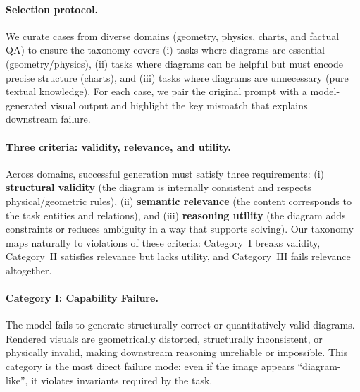 \documentclass{article}
\theoremstyle{plain}
\theoremstyle{definition}
\theoremstyle{remark}
\begin{document}
\paragraph{Selection protocol.}
We curate cases from diverse domains (geometry, physics, charts, and factual QA) to ensure the taxonomy
covers (i) tasks where diagrams are essential (geometry/physics),
(ii) tasks where diagrams can be helpful but must encode precise structure (charts),
and (iii) tasks where diagrams are unnecessary (pure textual knowledge).
For each case, we pair the original prompt with a model-generated visual output and
highlight the key mismatch that explains downstream failure.

\paragraph{Three criteria: validity, relevance, and utility.}
Across domains, successful generation must satisfy three requirements:
(i) \textbf{structural validity} (the diagram is internally consistent and respects physical/geometric rules),
(ii) \textbf{semantic relevance} (the content corresponds to the task entities and relations),
and (iii) \textbf{reasoning utility} (the diagram adds constraints or reduces ambiguity in a way that supports solving).
Our taxonomy maps naturally to violations of these criteria: Category~I breaks validity,
Category~II satisfies relevance but lacks utility, and Category~III fails relevance altogether.

\newcommand{\subcap}[1]{\caption*{\textbf{#1}}}
\newcommand{\smallnote}[1]{\vspace{2pt}\par{\footnotesize #1}}
\newcommand{\tightcaption}[1]{\caption{\vspace{-2pt}#1\vspace{-6pt}}}

\paragraph{Category I: Capability Failure.}
The model fails to generate structurally correct or quantitatively valid diagrams.
Rendered visuals are geometrically distorted, structurally inconsistent, or physically invalid,
making downstream reasoning unreliable or impossible.
This category is the most direct failure mode: even if the image appears ``diagram-like'',
it violates invariants required by the task.
\end{document}
